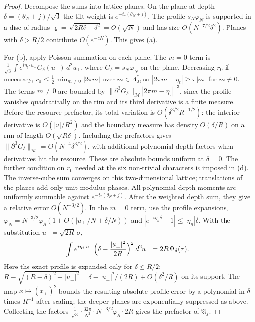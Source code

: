 \documentclass[11pt]{amsart}
\theoremstyle{definition}
\theoremstyle{remark}
\begin{document}
\begin{proof}
Decompose the sums into lattice planes.  On the plane at depth
$\delta=(\theta_N+j)/\sqrt3$ the tilt weight is $e^{-t_*(\theta_N+j)}$.  The
profile $s_N\varphi_N$ is supported in a disc of radius
$\varrho=\sqrt{2R\delta-\delta^2}=O(\sqrt N)$ and has size $O(N^{-7/2}\delta^2)$.
Planes with $\delta>R/2$ contribute $O(e^{-cN})$.  This gives (a).

For (b), apply Poisson summation on each plane.  The $m=0$ term is
$\frac1{\sqrt3}\int e^{i\eta_t\cdot u_\perp}G_\delta(u_\perp)\,d^2u_\perp$, where
$G_\delta=s_N\varphi_N$ on the plane.  Decreasing $r_0$ if necessary,
$r_0\le\frac12\min_{m\ne0}|2\pi m|$ over $m\in\Lambda_0^*$, so
$|2\pi m-\eta_t|\ge\pi|m|$ for $m\ne0$.  The
terms $m\ne0$ are bounded by $\|\partial^3G_\delta\|_{\mathcal M}|2\pi m-\eta_t|^{-3}$,
since the profile vanishes quadratically on the rim and its third
derivative is a finite measure. Before the resource prefactor, its total
variation is $O(\delta^{3/2}R^{-1/2})$: the interior derivative is
$O(|u|/R^2)$ and the boundary measure has density $O(\delta/R)$ on
a rim of length $O(\sqrt{R\delta})$. Including the prefactors gives
$\|\partial^3G_\delta\|_{\mathcal M}=O(N^{-4}\delta^{3/2})$, with additional
polynomial depth factors when derivatives hit the resource. These are
absolute bounds uniform at $\delta=0$.  The further condition on $r_0$
needed at the six non-trivial characters is imposed in (d).
The inverse-cube sum converges on this two-dimensional lattice;
translations of the planes add only unit-modulus phases. All polynomial
depth moments are uniformly summable against $e^{-t_*(\theta_N+j)}$.
After the weighted depth sum, they give a
relative error $O(N^{-3/2})$.  In the $m=0$ term, use the profile
expansions, $\varphi_N=N^{-3/2}\varphi_\partial(1+O(|u_\perp|/N+\delta/N))$ and
$|e^{-i\eta_n\delta}-1|\le|\eta_n|\delta$.  With the substitution
$u_\perp=\sqrt{2R}\,\sigma$,
\[
\int e^{i\eta_t\cdot u_\perp}\Bigl(\delta-\frac{|u_\perp|^2}{2R}\Bigr)_+^2d^2u_\perp=2R\,\Psi_\delta(\tau).
\]
Here the exact profile is expanded only for $\delta\le R/2$:
$R-\sqrt{(R-\delta)^2+|u_\perp|^2}
=\delta-|u_\perp|^2/(2R)+O(\delta^2/R)$ on its support.
The map $x\mapsto(x_+)^2$ bounds the resulting absolute profile error
by a polynomial in $\delta$ times $R^{-1}$ after scaling; the deeper
planes are exponentially suppressed as above.
Collecting the factors
$\frac1{\sqrt3}\cdot\frac{32\pi}{N^2}\cdot N^{-3/2}\varphi_\partial\cdot2R$ gives
the prefactor of $\mathfrak A_f$.


\end{proof}
\end{document}
